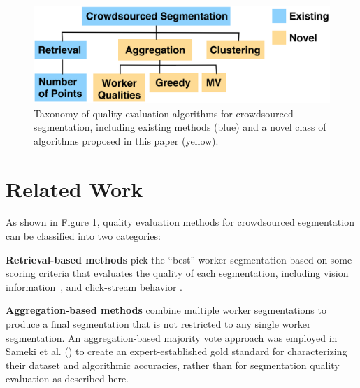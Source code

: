 \documentclass[letterpaper]{article}
\newcommand{\stitle}[1]{\noindent \textbf{#1}}
\begin{document}
\begin{figure}
\centering
\includegraphics[width=0.75\linewidth]{plots/flowchart.png}
\caption{Taxonomy of quality evaluation algorithms for crowdsourced segmentation, including existing methods (blue) and a novel class of algorithms proposed in this paper (yellow).
} %
\label{flowchart}
\end{figure}
\section{Related Work\label{sec:related}}
As shown in Figure \ref{flowchart}, quality evaluation methods for crowdsourced segmentation can be classified into two categories:

\stitle{Retrieval-based methods} pick the ``best'' worker segmentation based on some scoring criteria that evaluates the quality of each segmentation, including vision information~\cite{Vittayakorn2011,Russakovsky2015}, and click-stream behavior \cite{Cabezas2015,Sameki2015,Sorokin2008}.%

\stitle{Aggregation-based methods} combine multiple worker segmentations to produce a final segmentation that is not restricted to any single worker segmentation. An aggregation-based majority vote approach was employed in Sameki et al. (\citeyear{Sameki2015}) to create an expert-established gold standard for characterizing their dataset and algorithmic accuracies, rather than for segmentation quality evaluation as described here.
\end{document}
